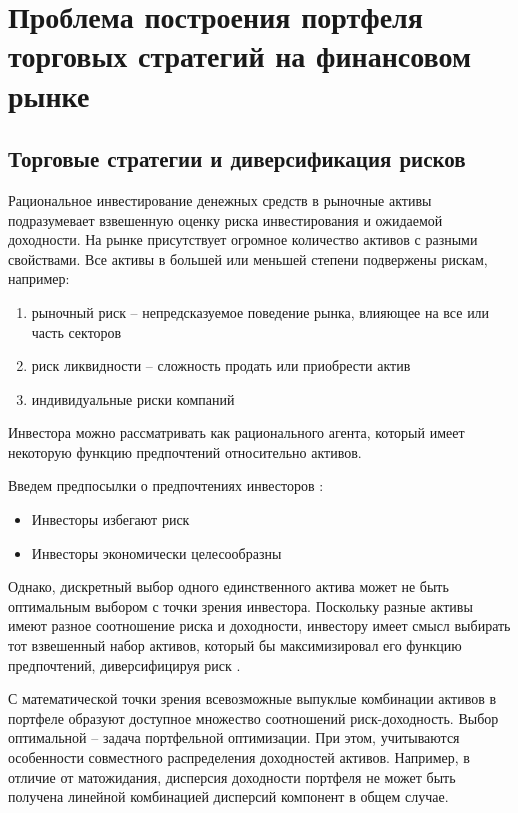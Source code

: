 \chapter{Проблема построения портфеля торговых стратегий на финансовом рынке}
\section{Торговые стратегии и диверсификация рисков}
Рациональное инвестирование денежных средств в рыночные активы подразумевает взвешенную оценку риска инвестирования и ожидаемой доходности. 
На рынке присутствует огромное количество активов с разными свойствами. Все активы в большей или меньшей степени подвержены рискам, например:
\begin{enumerate}
	\item рыночный риск -- непредсказуемое поведение рынка, влияющее на все или часть секторов
	\item риск ликвидности -- сложность продать или приобрести актив
	\item индивидуальные риски компаний
\end{enumerate}
Инвестора можно рассматривать как рационального агента, который имеет некоторую функцию предпочтений относительно активов.

Введем предпосылки о предпочтениях инвесторов \citep{neumann1944}:
\begin{itemize}
	\item Инвесторы избегают риск
	\item Инвесторы экономически целесообразны
\end{itemize}

Однако, дискретный выбор одного единственного актива может не быть оптимальным выбором с точки зрения инвестора. Поскольку разные активы имеют разное соотношение риска и доходности, инвестору имеет смысл выбирать тот взвешенный набор активов, который бы максимизировал его функцию предпочтений, диверсифицируя риск \citep{markovitz1959}.

С математической точки зрения всевозможные выпуклые комбинации активов в портфеле образуют доступное множество соотношений риск-доходность. Выбор оптимальной -- задача портфельной оптимизации. При этом, учитываются особенности совместного распределения доходностей активов. Например, в отличие от матожидания, дисперсия доходности портфеля не может быть получена линейной комбинацией дисперсий компонент в общем случае. 

